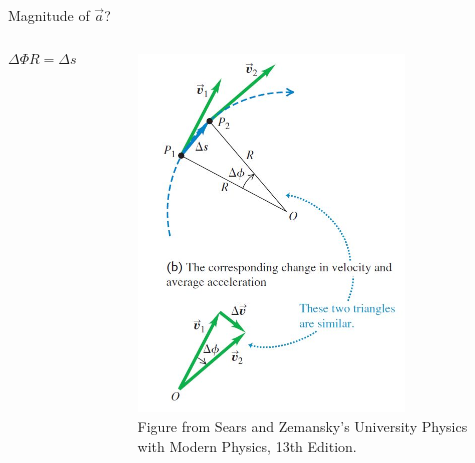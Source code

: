 \documentclass[]{beamer}
\begin{document}
\begin{frame}
    Magnitude of $\vec{a}$?
 
   
   \begin{columns}[c]
        \column{2.3in}  %
       
     

        \begin{equation*}
           \Delta \Phi R =\Delta s 
          \end{equation*}
          
        


        \column{2.5in}
        
  
        \begin{figure}[h!]  
            \includegraphics[width=0.8\textwidth]{images/27.jpg}
            \caption{ {\tiny Figure from Sears and Zemansky's University Physics 
            with Modern Physics, 13th Edition.} }
          \end{figure}
		  
		  
		  
           
     
        \end{columns}

    
      \end{frame}
      
\end{document}
